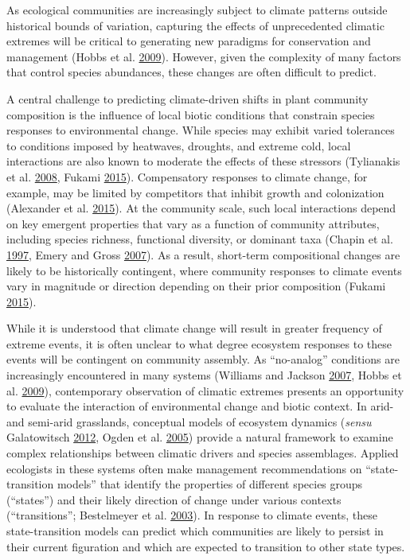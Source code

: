 \documentclass[twoside,12pt,final]{ucthesis-CA2012}
\begin{document}
\begin{ucmainmatter}
As ecological communities are increasingly subject to climate patterns outside historical bounds of variation, capturing the effects of unprecedented climatic extremes will be critical to generating new paradigms for conservation and management (Hobbs et al. \protect\hyperlink{ref-Hobbs2009}{2009}).
However, given the complexity of many factors that control species abundances, these changes are often difficult to predict.

A central challenge to predicting climate-driven shifts in plant community composition is the influence of local biotic conditions that constrain species responses to environmental change.
While species may exhibit varied tolerances to conditions imposed by heatwaves, droughts, and extreme cold, local interactions are also known to moderate the effects of these stressors (Tylianakis et al. \protect\hyperlink{ref-Tylianakis2008}{2008}, Fukami \protect\hyperlink{ref-Fukami2015}{2015}).
Compensatory responses to climate change, for example, may be limited by competitors that inhibit growth and colonization (Alexander et al. \protect\hyperlink{ref-Alexander2015}{2015}).
At the community scale, such local interactions depend on key emergent properties that vary as a function of community attributes, including species richness, functional diversity, or dominant taxa (Chapin et al. \protect\hyperlink{ref-Chapin1997}{1997}, Emery and Gross \protect\hyperlink{ref-Emery2007}{2007}).
As a result, short-term compositional changes are likely to be historically contingent, where community responses to climate events vary in magnitude or direction depending on their prior composition (Fukami \protect\hyperlink{ref-Fukami2015}{2015}).

While it is understood that climate change will result in greater frequency of extreme events, it is often unclear to what degree ecosystem responses to these events will be contingent on community assembly.
As ``no-analog'' conditions are increasingly encountered in many systems (Williams and Jackson \protect\hyperlink{ref-Williams2007}{2007}, Hobbs et al. \protect\hyperlink{ref-Hobbs2009}{2009}), contemporary observation of climatic extremes presents an opportunity to evaluate the interaction of environmental change and biotic context.
In arid- and semi-arid grasslands, conceptual models of ecosystem dynamics (\emph{sensu} Galatowitsch \protect\hyperlink{ref-Galatowitsch2012}{2012}, Ogden et al. \protect\hyperlink{ref-Ogden2005}{2005}) provide a natural framework to examine complex relationships between climatic drivers and species assemblages. Applied ecologists in these systems often make management recommendations on ``state-transition models'' that identify the properties of different species groups (``states'') and their likely direction of change under various contexts (``transitions''; Bestelmeyer et al. \protect\hyperlink{ref-Bestelmeyer2003}{2003}).
In response to climate events, these state-transition models can predict which communities are likely to persist in their current figuration and which are expected to transition to other state types.


\end{ucmainmatter}
\end{document}
